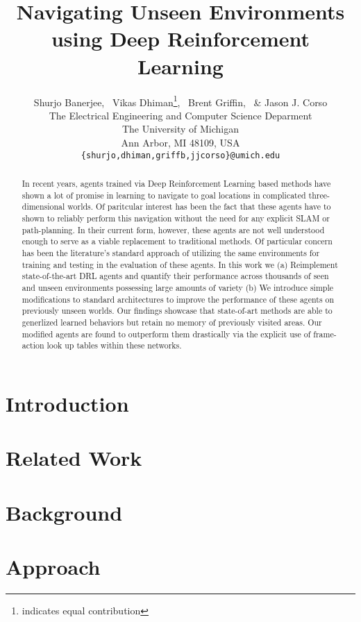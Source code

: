 \documentclass[]{article} %
\title{Navigating Unseen Environments using Deep Reinforcement Learning}
\author{Shurjo Banerjee\footnotemark[1],%
  \, Vikas Dhiman\thanks{indicates equal contribution},%
  \, Brent Griffin,%
  \, \& Jason J. Corso\\
  The Electrical Engineering and Computer Science Deparment\\
The University of Michigan\\
Ann Arbor, MI 48109, USA \\
\texttt{\{shurjo,dhiman,griffb,jjcorso\}@umich.edu} \\
}
\begin{document}
\maketitle

\begin{abstract}
In recent years, agents trained via Deep Reinforcement Learning based methods have shown a lot of promise in learning to navigate to goal locations in complicated three-dimensional worlds. Of paritcular interest has been the fact that these agents have to shown to reliably perform this navigation  without the need for any explicit SLAM or path-planning. In their current form, however, these agents are not well understood enough to serve as a viable replacement to traditional methods. Of particular concern has been the literature's standard approach of utilizing the same environments for training and testing in the evaluation of these agents. In this work we (a) Reimplement state-of-the-art DRL agents and quantify their performance across thousands of seen and unseen environments possessing large amounts of variety (b) We introduce simple modifications to standard architectures to improve the performance of these agents on previously unseen worlds. Our findings showcase that state-of-art methods are able to generlized learned behaviors but retain no memory of previously visited areas. Our modified agents are found to outperform them drastically via the explicit use of frame-action look up tables within these networks. 
\end{abstract}

\section{Introduction}
%



\section{Related Work}


\section{Background}


\section{Approach}

\end{document}
